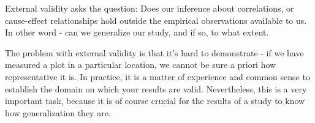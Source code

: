 \documentclass{tufte-book}
\begin{document}
External validity asks the question: Does our inference about correlations, or cause-effect relationships hold outside the empirical observations available to us. In other word - can we generalize our study, and if so, to what extent.

The problem with external validity is that it's hard to demonstrate - if we have measured a plot in a particular location, we cannot be sure a priori how representative it is. In practice, it is a matter of experience and common sense to establish the domain on which your results are valid. Nevertheless, this is a very important task, because it is of course crucial for the results of a study to know how generalization they are.

\vspace{1cm}
\end{document}
